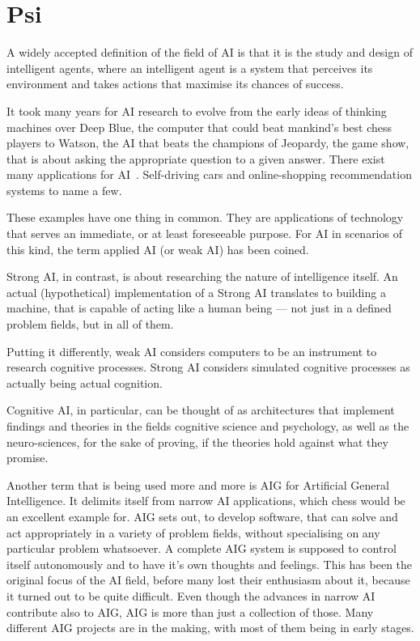 \chapter{Psi}

A widely accepted definition of the field of AI is that it is the study and design of intelligent agents, where an intelligent agent is a system that perceives its environment and takes actions that maximise its chances of success. %

It took many years for AI research to evolve from the early ideas of thinking machines over Deep Blue, the computer that could beat mankind's best chess players to Watson, the AI that beats the champions of Jeopardy, the game show, that is about asking the appropriate question to a given answer. There exist many applications for AI~. Self-driving cars and online-shopping recommendation systems to name a few.

These examples have one thing in common. They are applications of technology that serves an immediate, or at least foreseeable purpose. For AI in scenarios of this kind, the term applied AI (or weak AI) has been coined.

Strong AI, in contrast, is about researching the nature of intelligence itself. An actual (hypothetical) implementation of a Strong AI translates to building a machine, that is capable of acting like a human being --- not just in a defined problem fields, but in all of them.

Putting it differently, weak AI considers computers to be an instrument to research cognitive processes. Strong AI considers simulated cognitive processes as actually being actual cognition. 

Cognitive AI, in particular, can be thought of as architectures that implement findings and theories in the fields cognitive science and psychology, as well as the neuro-sciences, for the sake of proving, if the theories hold against what they promise. 



Another term that is being used more and more is AIG for Artificial General Intelligence. It delimits itself from narrow AI applications, which chess would be an excellent example for. AIG sets out, to develop software, that can solve and act appropriately in a variety of problem fields, without specialising on any particular problem whatsoever. A complete AIG system is supposed to control itself autonomously and to have it's own thoughts and feelings. This has been the original focus of the AI field, before many lost their enthusiasm about it, because it turned out to be quite difficult. Even though the advances in narrow AI contribute also to AIG, AIG is more than just a collection of those. Many different AIG projects are in the making, with most of them being in early stages.\cite{goertzel2007artificial}

